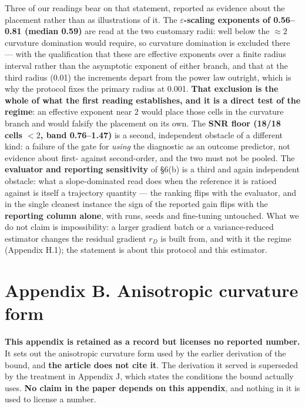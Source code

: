 \documentclass[pdflatex,sn-mathphys-ay]{sn-jnl}
\begin{document}
Three of our readings bear on that statement, reported as evidence about the placement rather than as illustrations of it. The \textbf{\ensuremath{\varepsilon}-scaling exponents of 0.56--0.81 (median 0.59)} are read at the two customary radii: well below the $\approx2$ curvature domination would require, so curvature domination is excluded there --- with the qualification that these are effective exponents over a finite radius interval rather than the asymptotic exponent of either branch, and that at the third radius (0.01) the increments depart from the power law outright, which is why the protocol fixes the primary radius at 0.001. \textbf{That exclusion is the whole of what the first reading establishes, and it is a direct test of the regime}: an effective exponent near $2$ would place those cells in the curvature branch and would falsify the placement on its own. The \textbf{SNR floor (18/18 cells $<2$, band 0.76--1.47)} is a second, independent obstacle of a different kind: a failure of the gate for \emph{using} the diagnostic as an outcome predictor, not evidence about first- against second-order, and the two must not be pooled. The \textbf{evaluator and reporting sensitivity} of \S{}6(b) is a third and again independent obstacle: what a slope-dominated read does when the reference it is ratioed against is itself a trajectory quantity --- the ranking flips with the evaluator, and in the single cleanest instance the sign of the reported gain flips with the \textbf{reporting column alone}, with runs, seeds and fine-tuning untouched. What we do not claim is impossibility: a larger gradient batch or a variance-reduced estimator changes the residual gradient $r_D$ is built from, and with it the regime (Appendix H.1); the statement is about this protocol and this estimator.

\section*{Appendix B. Anisotropic curvature form}

\textbf{This appendix is retained as a record but licenses no reported number.} It sets out the anisotropic curvature form used by the earlier derivation of the bound, and \textbf{the article does not cite it}. The derivation it served is superseded by the treatment in Appendix J, which states the conditions the bound actually uses. \textbf{No claim in the paper depends on this appendix}, and nothing in it is used to license a number.
\end{document}
